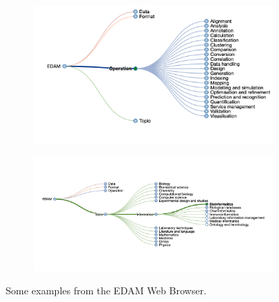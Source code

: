 \documentclass{scrartcl}
\begin{document}
\begin{figure}[h!]
  \centering
  \begin{subfigure}[b]{0.49\textwidth}
      \centering
      \includegraphics[width=\textwidth]{imgs/edam-graph-ex1.png}
  \end{subfigure}
  \begin{subfigure}[b]{0.49\textwidth}
      \centering
      \includegraphics[width=\textwidth]{imgs/edam-graph-ex2.png}
  \end{subfigure}
\caption{Some examples from the EDAM Web Browser.}
\label{fig:ed-ex}
\end{figure}
\end{document}
